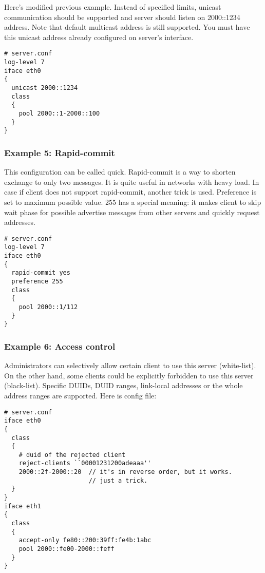 Here's modified previous example. Instead of specified limits, unicast
communication should be supported and server should listen on
2000::1234 address. Note that default multicast address is still
supported. You must have this unicast address already configured on 
server's interface.

\begin{lstlisting}
# server.conf
log-level 7
iface eth0
{
  unicast 2000::1234
  class
  {
    pool 2000::1-2000::100
  }
}  
\end{lstlisting}

\subsubsection{Example 5: Rapid-commit}
This configuration can be called quick. Rapid-commit is a way to shorten exchange to only two messages. It is
quite useful in networks with heavy load. In case if client does not
support rapid-commit, another trick is used. Preference is set to
maximum possible value. 255 has a special meaning: it makes client to
skip wait phase for possible advertise messages from other servers and
quickly request addresses.

\begin{lstlisting}
# server.conf
log-level 7
iface eth0
{
  rapid-commit yes
  preference 255
  class
  {
    pool 2000::1/112
  }
}  
\end{lstlisting}

\subsubsection{Example 6: Access control}
Administrators can selectively allow certain client to use this
server (white-list). On the other hand, some clients could be
explicitly forbidden to use this server (black-list). Specific DUIDs,
DUID ranges, link-local addresses or the whole address ranges are
supported. Here is config file:

\begin{lstlisting}
# server.conf
iface eth0
{
  class
  {
    # duid of the rejected client
    reject-clients ``00001231200adeaaa''
    2000::2f-2000::20  // it's in reverse order, but it works.
                       // just a trick. 
  }
}
iface eth1
{
  class
  {
    accept-only fe80::200:39ff:fe4b:1abc
    pool 2000::fe00-2000::feff
  }
}
\end{lstlisting}


